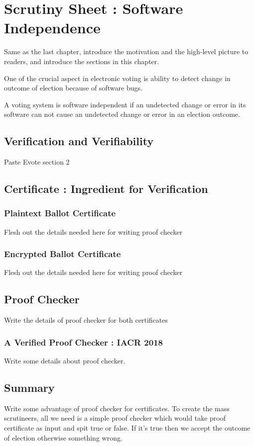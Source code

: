 \chapter{Scrutiny Sheet : Software Independence}
\label{cha:software_independence}
Same as the last chapter, introduce the motivation and the high-level picture to
readers, and introduce the sections in this chapter. 

One of the crucial 
aspect in electronic voting is ability to detect change in outcome of 
election because of software bugs. 


   A voting system is software independent if an undetected change or error
   in its software can not cause an undetected change or error in an 
   election outcome.
\section{Verification and Verifiability}
  Paste Evote section 2

\section{Certificate : Ingredient for Verification}
   
   \subsection{Plaintext Ballot Certificate}
    Flesh out the details needed here for writing proof checker
    
    \subsection{Encrypted Ballot Certificate}
    Flesh out the details needed here for writing proof checker
    
   
\section{Proof Checker}
  Write the details of proof checker for both certificates
  
  	\subsection{A Verified Proof Checker : IACR 2018}
  	Write some details about proof checker.
  
\section{Summary}
   Write some advantage of proof checker for certificates.
   To create the mass scrutineers, all we need is a simple proof checker
   which would take proof certificate as input and spit true or false.
   If it's true then we accept the outcome of election otherwise something 
   wrong.